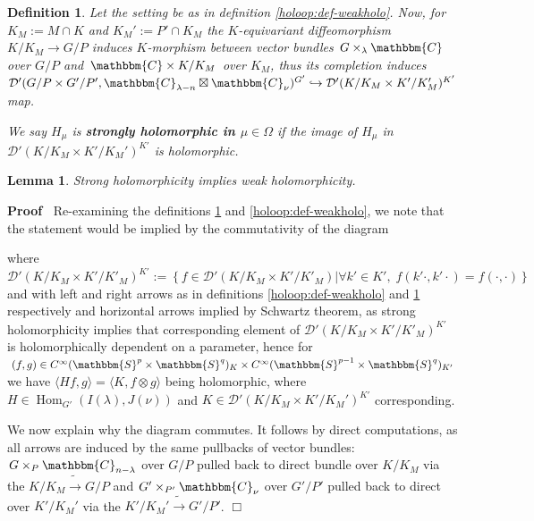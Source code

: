 \documentclass{article}
\newcommand{\assign}{:=}
\newcommand{\tmop}[1]{\ensuremath{\operatorname{#1}}}
\newcommand{\tmtextbf}[1]{{\bfseries{#1}}}
\newenvironment{proof}{\noindent\textbf{Proof\ }}{\hspace*{\fill}$\Box$\medskip}
\newtheorem{definition}{Definition}
\newtheorem{lemma}{Lemma}
\begin{document}
\begin{definition}
  \label{holoop:def-strongholo}Let the setting be as in definition
  \ref{holoop:def-weakholo}. Now, for $K_M \assign M \cap K$ and $K_M' \assign
  P' \cap K_M$ the $K$-equivariant diffeomorphism $K / K_M \rightarrow G / P$
  induces $K$-morphism between vector bundles $G \times_{\lambda} \mathbbm{C}$
  over $G / P$ and $\mathbbm{C} \times K / K_M$ over $K_M$, thus its
  completion induces $\mathcal{D}' (G / P \times G' / P', \mathbbm{C}_{\lambda
  - n} \boxtimes \mathbbm{C}_{\nu})^{G'} \hookrightarrow \mathcal{D}' (K / K_M
  \times K' / K_M')^{K'}$ map.
  
  We say $H_{\mu}$ is \tmtextbf{strongly holomorphic in $\mu \in \Omega$} if
  the image of $H_{\mu}$ in $\mathcal{D}' (K / K_M \times K' / K_M')^{K'}$ is
  holomorphic.
\end{definition}

\begin{lemma}
  \label{holoop:lem-strong-implies-weak}Strong holomorphicity implies weak
  holomorphicity.
\end{lemma}

\begin{proof}
  Re-examining the definitions \ref{holoop:def-strongholo} and
  \ref{holoop:def-weakholo}, we note that the statement would be implied by
  the commutativity of the diagram
  
  \begin{center}
  \end{center}
  
  where $\mathcal{D}' (K / K_M \times K' / K'_M)^{K'} \assign \left\{ f \in
  \mathcal{D}' (K / K_M \times K' / K'_M) \big| \forall k' \in K', \; f (k'
  \cdot, k' \cdot) = f (\cdot, \cdot) \right\}$ and with left and right arrows
  as in definitions \ref{holoop:def-weakholo} and \ref{holoop:def-strongholo}
  respectively and horizontal arrows implied by Schwartz theorem, as strong
  holomorphicity implies that corresponding element of $\mathcal{D}' (K / K_M
  \times K' / K'_M)^{K'}$ is holomorphically dependent on a parameter, hence
  for $(f, g) \in C^{\infty} (\mathbbm{S}^p \times \mathbbm{S}^q)_K \times
  C^{\infty} (\mathbbm{S}^{p - 1} \times \mathbbm{S}^q)_{K'}$ we have $\langle
  H f, g \rangle = \langle K, f \otimes g \rangle$ being holomorphic, where $H
  \in \tmop{Hom}_{G'} (I (\lambda), J (\nu))$ and $K \in \mathcal{D}' (K / K_M
  \times K' / K_M')^{K'}$ corresponding.
  
  We now explain why the diagram commutes. It follows by direct computations,
  as all arrows are induced by the same pullbacks of vector bundles: $G
  \times_P \mathbbm{C}_{n - \lambda}$ over $G / P$ pulled back to direct
  bundle over $K / K_M$ via the $K / K_M^{} \tilde{\rightarrow} G / P$ and $G'
  \times_{P'} \mathbbm{C}_{\nu}$ over $G' / P'$ pulled back to direct over $K'
  / K_M'$ via the $K' / K_M' \tilde{\rightarrow} G' / P'$.
\end{proof}
\end{document}
